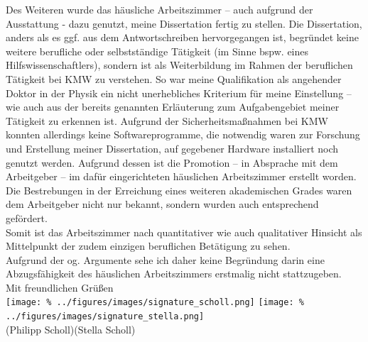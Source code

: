 \documentclass[
  fontsize=11pt,
  paper=a4,
  parskip=half,
  enlargefirstpage=on,    %
  fromalign=right,        %
  fromphone=on,           %
  fromrule=aftername,     %
  addrfield=off,           %
  backaddress=off,         %
  subject=beforeopening,  %
  locfield=narrow,        %
  foldmarks=on,           %
]{scrlttr2}
\begin{document}
\begin{letter}{}
  Des Weiteren wurde das häusliche Arbeitszimmer – auch aufgrund der Ausstattung - dazu genutzt, meine Dissertation fertig zu stellen. Die Dissertation, anders als es ggf. aus dem Antwortschreiben hervorgegangen ist, begründet keine weitere berufliche oder selbstständige Tätigkeit (im Sinne bspw. eines Hilfswissenschaftlers), sondern ist als Weiterbildung im Rahmen der beruflichen Tätigkeit bei KMW zu verstehen. So war meine Qualifikation als angehender Doktor in der Physik ein nicht unerhebliches Kriterium für meine Einstellung – wie auch aus der bereits genannten Erläuterung zum Aufgabengebiet meiner Tätigkeit zu erkennen ist. Aufgrund der Sicherheitsmaßnahmen bei KMW konnten allerdings keine Softwareprogramme, die notwendig waren zur Forschung und Erstellung meiner Dissertation, auf gegebener Hardware installiert noch genutzt werden. Aufgrund dessen ist die Promotion – in Absprache mit dem Arbeitgeber – im dafür eingerichteten häuslichen Arbeitszimmer erstellt worden. Die Bestrebungen in der Erreichung eines weiteren akademischen Grades waren dem Arbeitgeber nicht nur bekannt, sondern wurden auch entsprechend gefördert.\\[0.5cm]%
  Somit ist das Arbeitszimmer nach quantitativer wie auch qualitativer Hinsicht als Mittelpunkt der zudem einzigen beruflichen Betätigung zu sehen.\\%
  Aufgrund der og. Argumente sehe ich daher keine Begründung darin eine Abzugsfähigkeit des häuslichen Arbeitszimmers erstmalig nicht stattzugeben.\\%

  Mit freundlichen Grüßen\\%
  \texttt{[image: \%
    ../figures/images/signature\_scholl.png]}%
  \hspace*{1cm}%
  \texttt{[image: \%
    ../figures/images/signature\_stella.png]}\\[-0.7cm]%
  (Philipp Scholl)\hspace*{2cm}(Stella Scholl)%

\end{letter}
\end{document}
